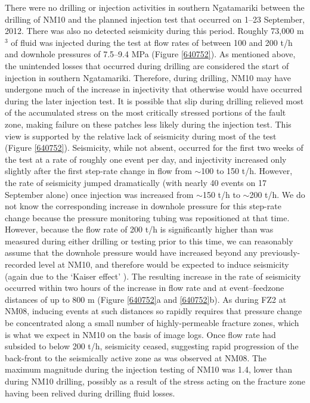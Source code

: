 There were no drilling or injection activities in southern Ngatamariki between the drilling of NM10 and the planned injection test that occurred on 1--23 September, 2012. There was also no detected seismicity during this period. Roughly 73,000 m$^3$ of fluid was injected during the test at flow rates of between 100 and 200 t/h and downhole pressures of 7.5--9.4 MPa (Figure \ref{640752}). As mentioned above, the unintended losses that occurred during drilling are considered the start of injection in southern Ngatamariki. Therefore, during drilling, NM10 may have undergone much of the increase in injectivity that otherwise would have occurred during the later injection test. It is possible that slip during drilling relieved most of the accumulated stress on the most critically stressed portions of the fault zone, making failure on these patches less likely during the injection test. This view is supported by the relative lack of seismicity during most of the test (Figure \ref{640752}). Seismicity, while not absent, occurred for the first two weeks of the test at a rate of roughly one event per day, and injectivity increased only slightly after the first step-rate change in flow from $\sim$100 to 150 t/h. However, the rate of seismicity jumped dramatically (with nearly 40 events on 17 September alone) once injection was increased from $\sim$150 t/h to $\sim$200 t/h. We do not know the corresponding increase in downhole pressure for this step-rate change because the pressure monitoring tubing was repositioned at that time. However, because the flow rate of 200 t/h is significantly higher than was measured during either drilling or testing prior to this time, we can reasonably assume that the downhole pressure would have increased beyond any previously-recorded level at NM10, and therefore would be expected to induce seismicity (again due to the `Kaiser effect' \citep{Holcomb_1993}). The resulting increase in the rate of seismicity occurred within two hours of the increase in flow rate and at event--feedzone distances of up to 800 m (Figure \ref{640752}a and \ref{640752}b). As during FZ2 at NM08, inducing events at such distances so rapidly requires that pressure change be concentrated along a small number of highly-permeable fracture zones, which is what we expect in NM10 on the basis of image logs. Once flow rate had subsided to below 200 t/h, seismicity ceased, suggesting rapid progression of the back-front to the seismically active zone as was observed at NM08. The maximum magnitude during the injection testing of NM10 was 1.4, lower than during NM10 drilling, possibly as a result of the stress acting on the fracture zone having been relived during drilling fluid losses.

